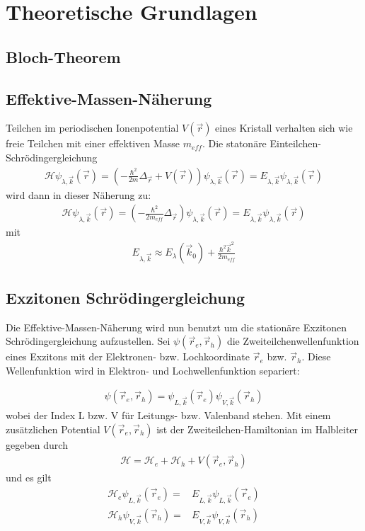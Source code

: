 \section{Theoretische Grundlagen}\label{kapitel1}

\subsection{Bloch-Theorem}\label{kapitel11}

\subsection{Effektive-Massen-Näherung}\label{kapitel111}
Teilchen im periodischen Ionenpotential $V(\vec{r})$ eines Kristall verhalten sich wie freie Teilchen mit einer effektiven Masse
$m_{eff}$. Die statonäre Einteilchen-Schrödingergleichung 
\begin{align}
\mathcal{H}\psi_{\lambda,\vec{k}}(\vec{r})=
\left(-\frac{\hbar^2}{2m}\Delta_{\vec{r}}+V(\vec{r})\right)\psi_{\lambda,\vec{k}}(\vec{r})=
E_{\lambda,\vec{k}}\psi_{\lambda,\vec{k}}(\vec{r})
\end{align}
wird dann in dieser Näherung zu:
\begin{align}
\mathcal{H}\psi_{\lambda,\vec{k}}(\vec{r})=
\left(-\frac{\hbar^2}{2m_{eff}}\Delta_{\vec{r}}\right)\psi_{\lambda,\vec{k}}(\vec{r})=
E_{\lambda,\vec{k}}\psi_{\lambda,\vec{k}}(\vec{r})
\end{align} 
mit 
\begin{align}
E_{\lambda,\vec{k}}\approx E_\lambda(\vec{k}_0)+\frac{\hbar^2\vec{k}^2}{2m_{eff}}
\end{align}

\subsection{Exzitonen Schrödingergleichung}\label{kapitel12}
Die Effektive-Massen-Näherung wird nun benutzt um die stationäre Exzitonen Schrödingergleichung aufzustellen.
Sei $\psi\left({\vec{r}_e,\vec{r}_h}\right)$ die Zweiteilchenwellenfunktion eines Exzitons mit der Elektronen- bzw. Lochkoordinate $\vec{r}_e$ bzw. $\vec{r}_h$.
Diese Wellenfunktion wird in Elektron- und Lochwellenfunktion separiert:

\begin{align}
 \psi\left({\vec{r}_e,\vec{r}_h}\right)=\psi_{L,\vec{k}}(\vec{r}_e)\psi_{V,\vec{k}}(\vec{r}_h)
\end{align} wobei der Index L bzw. V für Leitungs- bzw. Valenband stehen.
Mit einem zusätzlichen Potential $V(\vec{r}_e,\vec{r}_h)$ ist der Zweiteilchen-Hamiltonian im Halbleiter gegeben durch
\begin{align}
\mathcal{H}=\mathcal{H}_e+\mathcal{H}_h+V(\vec{r}_e,\vec{r}_h)
\end{align}
und es gilt
\begin{align}
\mathcal{H}_e\psi_{L,\vec{k}}(\vec{r}_e)=& E_{L,\vec{k}}\psi_{L,\vec{k}}(\vec{r}_e)\\
\mathcal{H}_h\psi_{V,\vec{k}}(\vec{r}_h)=& E_{V,\vec{k}}\psi_{V,\vec{k}}(\vec{r}_h)
\end{align}

